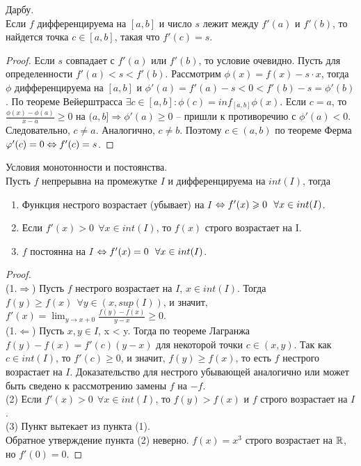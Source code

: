     \begin{theorem}{Дарбу.}\\
        Если $f$ дифференцируема на $[a, b]$ и число $s$ лежит между $f'(a)$ и $f'(b)$,
        то найдется точка $c \in [a, b]$, такая что $f'(c) = s$.
    \end{theorem}
    
    \begin{proof}
        Если $s$ совпадает с $f'(a)$ или $f'(b)$, то условие очевидно.
        Пусть для определенности $f'(a) < s < f'(b)$.
        Рассмотрим $\phi(x) = f(x) - s \cdot x$, тогда $\phi$ дифференцируема на $[a, b]$
        и $\phi'(a) = f'(a) - s < 0 < f'(b) - s = \phi'(b)$.
        По теореме Вейерштрасса $\exists c \in [a, b] : \phi(c) = inf_{[a, b]}\phi(x)$. Если $c = a$, то
        $\frac{\phi(x)-\phi(a)}{x-a} \geq 0$ на $(a, b] \Rightarrow \phi'(a) \geq 0$ -- пришли к противоречию с $\phi'(a) < 0$.
        Следовательно, $c \neq a$. Аналогично, $c \neq b$. Поэтому $c \in (a, b)$ по теореме Ферма $\varphi'(c) = 0 \Leftrightarrow f'(c) = s$.
    \end{proof}
    
    \begin{theorem}{Условия монотонности и постоянства.}\\
        Пусть $f$ непрерывна на промежутке $I$ и дифференцируема на $int(I)$, тогда
        \begin{enumerate}
            \item Функция нестрого возрастает (убывает) на $I$ $\Leftrightarrow f'(x) \geqslant 0 \ \ \forall x \in int(I)$.
            \item Если $f'(x) > 0 \ \ \forall x \in int(I)$, то $f(x)$ строго возрастает на I.
            \item $f$ постоянна на $I$ $\Leftrightarrow f'(x) = 0 \ \ \forall x \in int(I)$.
        \end{enumerate}
    \end{theorem}
    
    \begin{proof} \ \\
        (1.$\Rightarrow$) Пусть $f$ нестрого возрастает на $I$, $x \in int(I)$.
        Тогда $f(y) \geq f(x) \ \ \forall y \in (x, sup(I))$, и значит, $f'(x) = \lim_{y \to x+0} \frac{f(y)-f(x)}{y-x} \geq 0$.\\
        (1.$\Leftarrow$) Пусть $x, y \in I$, x < y. Тогда по теореме Лагранжа $f(y)-f(x) = f'(c)(y-x)$ для некоторой точки $c \in (x, y)$.
        Так как $c \in int(I)$, то $f'(c) \geq 0$, и значит, $f(y) \geq f(x)$, то есть $f$ нестрого возрастает на $I$.
        Доказательство для нестрого убывающей аналогично или может быть сведено к рассмотрению замены $f$ на $-f$.\\
        (2) Если $f'(x) > 0 \ \ \forall x \in int(I)$, то $f(y) > f(x)$ и $f$ строго возрастает на $I$.\\
        (3) Пункт вытекает из пункта (1).\\
        Обратное утверждение пункта (2) неверно. $f(x) = x^3$ строго возрастает на $\mathbb{R}$, но $f'(0) = 0$.
    \end{proof}
    
